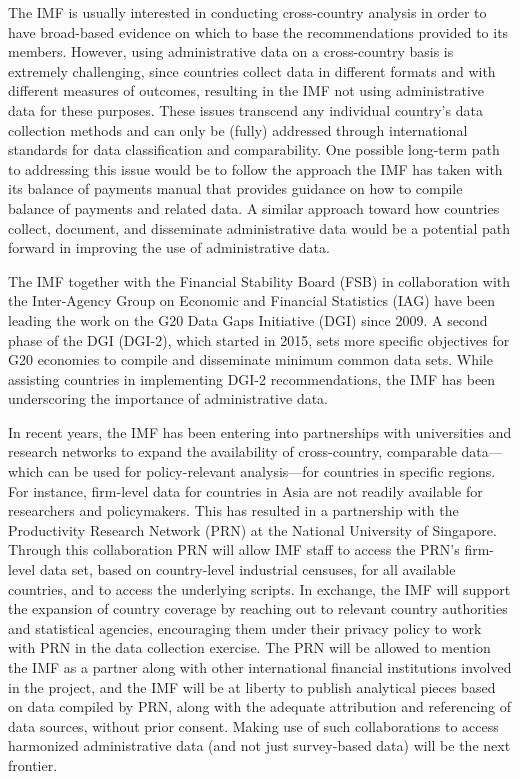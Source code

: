 \documentclass[
]{WileySix}
\begin{document}
The IMF is usually interested in conducting cross-country analysis in order to have broad-based evidence on which to base the recommendations provided to its members. However, using administrative data on a cross-country basis is extremely challenging, since countries collect data in different formats and with different measures of outcomes, resulting in the IMF not using administrative data for these purposes. These issues transcend any individual country's data collection methods and can only be (fully) addressed through international standards for data classification and comparability. One possible long-term path to addressing this issue would be to follow the approach the IMF has taken with its balance of payments manual that provides guidance on how to compile balance of payments and related data. A similar approach toward how countries collect, document, and disseminate administrative data would be a potential path forward in improving the use of administrative data.

The IMF together with the Financial Stability Board (FSB) in collaboration with the Inter-Agency Group on Economic and Financial Statistics (IAG) have been leading the work on the G20 Data Gaps Initiative (DGI) since 2009. A second phase of the DGI (DGI-2), which started in 2015, sets more specific objectives for G20 economies to compile and disseminate minimum common data sets. While assisting countries in implementing DGI-2 recommendations, the IMF has been underscoring the importance of administrative data.

In recent years, the IMF has been entering into partnerships with universities and research networks to expand the availability of cross-country, comparable data--- which can be used for policy-relevant analysis---for countries in specific regions. For instance, firm-level data for countries in Asia are not readily available for researchers and policymakers. This has resulted in a partnership with the Productivity Research Network (PRN) at the National University of Singapore. Through this collaboration PRN will allow IMF staff to access the PRN's firm-level data set, based on country-level industrial censuses, for all available countries, and to access the underlying scripts. In exchange, the IMF will support the expansion of country coverage by reaching out to relevant country authorities and statistical agencies, encouraging them under their privacy policy to work with PRN in the data collection exercise. The PRN will be allowed to mention the IMF as a partner along with other international financial institutions involved in the project, and the IMF will be at liberty to publish analytical pieces based on data compiled by PRN, along with the adequate attribution and referencing of data sources, without prior consent. Making use of such collaborations to access harmonized administrative data (and not just survey-based data) will be the next frontier.
\end{document}
